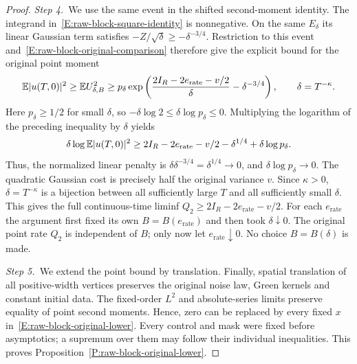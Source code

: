 \begin{proof}
  \medskip
  \noindent\textit{Step 4.~}We use the same event in the shifted second-moment
  identity.
  The integrand in~\eqref{E:raw-block-square-identity} is nonnegative. On the
  same $E_\delta$ its linear Gaussian term satisfies $-Z/\sqrt\delta \ge
  -\delta^{-3/4}$. Restriction to this event
  and~\eqref{E:raw-block-original-comparison} therefore give the explicit bound
  for the original point moment
  \[
    \mathbb{E}|u(T,0)|^2\ge\mathbb{E} U_{\delta,B}^2
    \ge p_\delta\exp\left(
    \frac{2I_R-2e_{\mathrm{rate}}-v/2}{\delta}
    -\delta^{-3/4}\right),\qquad \delta=T^{-\kappa}.
  \]
  Here $p_\delta \ge 1/2$ for small $\delta$, so $-\delta\log2 \le \delta\log
  p_\delta \le 0$. Multiplying the logarithm of the preceding inequality by
  $\delta$ yields
  \[
    \delta\log\mathbb{E}|u(T,0)|^2
    \ge2I_R-2e_{\mathrm{rate}}-v/2
    -\delta^{1/4}+\delta\log p_\delta.
  \]
  Thus, the normalized linear penalty is $\delta\delta^{-3/4} = \delta^{1/4} \to
  0$, and $\delta\log p_\delta \to 0$. The quadratic Gaussian cost is precisely
  half the original variance $v$. Since $\kappa > 0$, $\delta = T^{-\kappa}$ is
  a bijection between all sufficiently large $T$ and all sufficiently small
  $\delta$. This gives the full continuous-time liminf $Q_2 \ge
  2I_R-2e_{\mathrm{rate}}-v/2$. For each $e_{\mathrm{rate}}$ the argument first
  fixed its own $B = B(e_{\mathrm{rate}})$ and then took $\delta\downarrow0$.
  The original point rate $Q_2$ is independent of $B$; only now let
  $e_{\mathrm{rate}}\downarrow0$. No choice $B = B(\delta)$ is made.


  \medskip
  \noindent\textit{Step 5.~}We extend the point bound by translation.
  Finally, spatial translation of all positive-width vertices preserves the
  original noise law, Green kernels and constant initial data. The fixed-order
  $L^2$ and absolute-series limits preserve equality of point second moments.
  Hence, zero can be replaced by every fixed $x$
  in~\eqref{E:raw-block-original-lower}. Every control and mask were fixed
  before asymptotics; a supremum over them may follow their individual
  inequalities. This proves Proposition~\ref{P:raw-block-original-lower}.
\end{proof}
